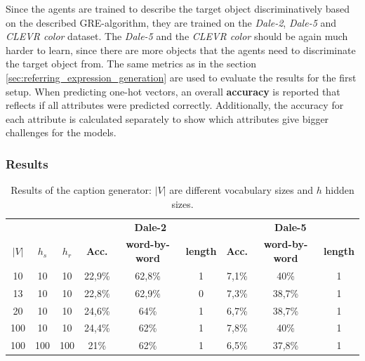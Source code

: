 Since the agents are trained to describe the target object discriminatively based on the described GRE-algorithm, they are trained on the \emph{Dale-2}, \emph{Dale-5} and \emph{CLEVR color} dataset.
The \emph{Dale-5} and the \emph{CLEVR color} should be again much harder to learn, since there are more objects that the agents need to discriminate the target object from.
The same metrics as in the section \ref{sec:referring_expression_generation} are used to evaluate the results for the first setup.
When predicting one-hot vectors, an overall \textbf{accuracy} is reported that reflects if all attributes were predicted correctly.
Additionally, the accuracy for each attribute is calculated separately to show which attributes give bigger challenges for the models.

\subsubsection*{Results}
\begin{table}[ht]
    \centering
    \begin{tabular}{ccc|ccc|ccc}
        \toprule
              &         &         & \multicolumn{3}{c}{\textbf{Dale-2}} & \multicolumn{3}{c}{\textbf{Dale-5}}                                                                             \\\cmidrule(lr){4-6}\cmidrule(lr){7-9}
        $|V|$ & $h_{s}$ & $h_{r}$ & \textbf{Acc.}                       & \textbf{word-by-word}               & \textbf{length} & \textbf{Acc.} & \textbf{word-by-word} & \textbf{length} \\\midrule
        {10}  & {10}    & {10}    & {22,9\%}                            & {62,8\%}                            & {1}             & {7,1\%}       & {40\%}                & {1}             \\
        {13}  & {10}    & {10}    & {22,8\%}                            & {62,9\%}                            & {0}             & {7,3\%}       & {38,7\%}              & {1}             \\
        {20}  & {10}    & {10}    & {24,6\%}                            & {64\%}                              & {1}             & {6,7\%}       & {38,7\%}              & {1}             \\
        {100} & {10}    & {10}    & {24,4\%}                            & {62\%}                              & {1}             & {7,8\%}       & {40\%}                & {1}             \\
        {100} & {100}   & {100}   & {21\%}                              & {62\%}                              & {1}             & {6,5\%}       & {37,8\%}              & {1}             \\
        \bottomrule
    \end{tabular}
    \caption{Results of the caption generator: $|V|$ are different vocabulary sizes and $h$ hidden sizes.}
    \label{tab:results_caption_generator_game}
\end{table}

